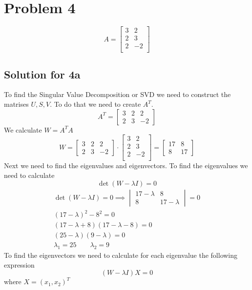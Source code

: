 \documentclass[a4paper,fleqn,12pt]{article}
\begin{document}
\section{Problem 4}
$$
A = \begin{bmatrix}
3 & 2 \\
2 & 3 \\
2 & -2 \\
\end{bmatrix}
$$
\subsection{Solution for 4a}
To find the Singular Value Decomposition or SVD we need to construct the matrises $U, S, V$. To do that we need to create $A^T$.
$$
A^T = \begin{bmatrix}
3 & 2 & 2 \\
2 & 3 & -2
\end{bmatrix}
$$
We calculate $W = A^T A$
$$
W = 
\begin{bmatrix}
3 & 2 & 2 \\
2 & 3 & -2
\end{bmatrix} \cdot
\begin{bmatrix}
3 & 2 \\
2 & 3 \\
2 & -2 \\
\end{bmatrix} 
 = 
\begin{bmatrix}
17 & 8 \\
8 & 17
\end{bmatrix}
$$
Next we need to find the eigenvalues and eigenvectors. To find the eigenvalues we need to calculate 
$$\det (W -\lambda I) = 0$$
\begin{gather*}
\det (W - \lambda I) = 0 \implies 
\begin{vmatrix}
17-\lambda & 8 \\
8 & 17-\lambda 
\end{vmatrix} = 0 \\
(17-\lambda)^2 - 8^2 = 0 \\
(17-\lambda + 8)(17-\lambda -8) = 0 \\
(25 - \lambda) (9-\lambda)= 0 \\
\lambda_1 = 25 \qquad \lambda_2 = 9 
\end{gather*}
To find the eigenvectors we need to calculate for each eigenvalue the following expression
$$
(W - \lambda I ) X = 0
$$
where $X = (x_1, x_2)^T$
\end{document}
